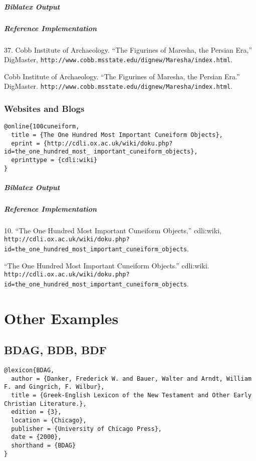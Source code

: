 \documentclass[a4paper]{article}
\newenvironment{biboutput}{%
  \subparagraph{Biblatex Output}
}{\color{black}}
\newenvironment{refimp}{%
  \subparagraph{Reference Implementation}
  \color{reference-colour}
  \rm
}{\par\color{black}}
\begin{document}
\begin{biboutput}
\end{biboutput}

\begin{refimp}
  37. Cobb Institute of Archaeology. “The Figurines of Maresha, the Persian
  Era,” DigMaster,
  \nolinkurl{http://www.cobb.msstate.edu/dignew/Maresha/index.html}.

  \hangindent\bibindent Cobb Institute of Archaeology. “The Figurines of
  Maresha, the Persian Era.” DigMaster.
  \nolinkurl{http://www.cobb.msstate.edu/dignew/Maresha/index.html}.
\end{refimp}

\subsubsection{Websites and Blogs}

\begin{lstlisting}
@online{100cuneiform,
  title = {The One Hundred Most Important Cuneiform Objects},
  eprint = {http://cdli.ox.ac.uk/wiki/doku.php?id=the_one_hundred_most_ important_cuneiform_objects},
  eprinttype = {cdli:wiki}
}
\end{lstlisting}

\begin{biboutput}
\end{biboutput}

\begin{refimp}
  10. “The One Hundred Most Important Cuneiform Objects,” cdli:wiki,
  \nolinkurl{http://cdli.ox.ac.uk/wiki/doku.php?id=the_one_hundred_most_important_cuneiform_objects}.

  \hangindent\bibindent “The One Hundred Most Important Cuneiform Objects.”
  cdli:wiki.
  \nolinkurl{http://cdli.ox.ac.uk/wiki/doku.php?id=the_one_hundred_most_important_cuneiform_objects}.
\end{refimp}

\section{Other Examples}

\subsection{BDAG, BDB, BDF}

\begin{lstlisting}
@lexicon{BDAG,
  author = {Danker, Frederick W. and Bauer, Walter and Arndt, William F. and Gingrich, F. Wilbur},
  title = {Greek-English Lexicon of the New Testament and Other Early Christian Literature.},
  edition = {3},
  location = {Chicago},
  publisher = {University of Chicago Press},
  date = {2000},
  shorthand = {BDAG}
}
\end{lstlisting}
\end{document}
